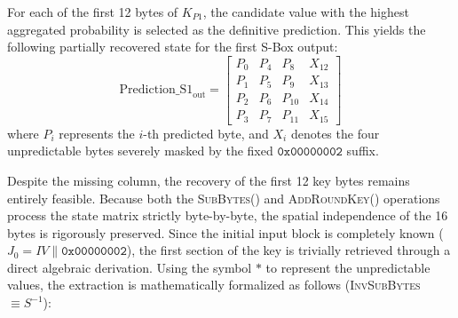 \documentclass[11pt,a4paper]{report}
\begin{document}
For each of the first 12 bytes of $K_{P1}$, the candidate value with the highest aggregated probability is selected as the definitive prediction. 
This yields the following partially recovered state for the first S-Box output:
\begin{equation}
\text{Prediction\_S1}_{\text{out}} = \begin{bmatrix}
    P_0 & P_4 & P_8 & X_{12} \\
    P_1 & P_5 & P_9 & X_{13} \\
    P_2 & P_6 & P_{10} & X_{14} \\
    P_3 & P_7 & P_{11} & X_{15}
\end{bmatrix}
\end{equation}
where $P_i$ represents the $i$-th predicted byte, and $X_i$ denotes the four unpredictable bytes severely masked by the fixed $\mathtt{0x00000002}$ suffix.

Despite the missing column, the recovery of the first 12 key bytes remains entirely feasible. 
Because both the \textsc{SubBytes}() and \textsc{AddRoundKey()} operations process the state matrix strictly byte-by-byte, 
the spatial independence of the 16 bytes is rigorously preserved. 
Since the initial input block is completely known ($J_0 = \mathit{IV} \parallel \mathtt{0x00000002}$), the first section of the key is trivially retrieved through a direct algebraic derivation. 
Using the symbol $*$ to represent the unpredictable values, the extraction is mathematically formalized as follows (\textsc{InvSubBytes} $\equiv S^{-1}$):
\end{document}
